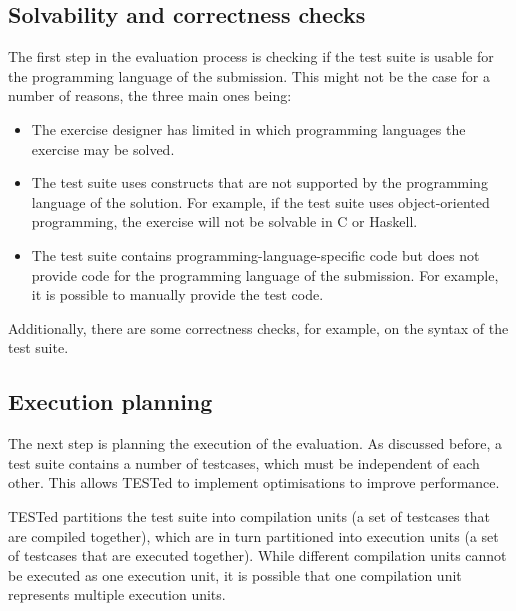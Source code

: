 \documentclass[../main]{subfiles}
\begin{document}
\subsection{Solvability and correctness checks}\label{subsec:solvability-and-correctness-checks}

The first step in the evaluation process is checking if the test suite is usable for the programming language of the submission.
This might not be the case for a number of reasons, the three main ones being:

\begin{itemize}
    \item The exercise designer has limited in which programming languages the exercise may be solved.
    \item The test suite uses constructs that are not supported by the programming language of the solution.
          For example, if the test suite uses object-oriented programming, the exercise will not be solvable in C or Haskell.
    \item The test suite contains programming-language-specific code but does not provide code for the programming language of the submission.
          For example, it is possible to manually provide the test code.
\end{itemize}

Additionally, there are some correctness checks, for example, on the syntax of the test suite.

\subsection{Execution planning}\label{subsec:execution-planning}

The next step is planning the execution of the evaluation.
As discussed before, a test suite contains a number of testcases, which must be independent of each other.
This allows TESTed to implement optimisations to improve performance.

TESTed partitions the test suite into compilation units (a set of testcases that are compiled together), which are in turn partitioned into execution units (a set of testcases that are executed together).
While different compilation units cannot be executed as one execution unit, it is possible that one compilation unit represents multiple execution units.
\end{document}
